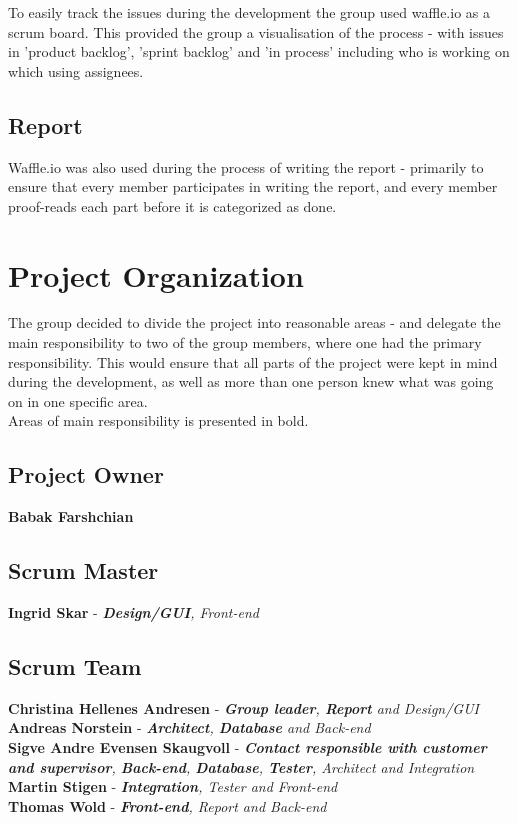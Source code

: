 \noindent To easily track the issues during the development the group used waffle.io as a scrum board. This provided the group a visualisation of the process - with issues in 'product backlog', 'sprint backlog' and 'in process' including who is working on which using assignees. 

\subsection{Report}
Waffle.io was also used during the process of writing the report - primarily to ensure that every member participates in writing the report, and every member proof-reads each part before it is categorized as done.  


\section{Project Organization}
The group decided to divide the project into reasonable areas - and delegate the main responsibility to two of the group members, where one had the primary responsibility. This would ensure that all parts of the project were kept in mind during the development, as well as more than one person knew what was going on in one specific area.\\
Areas of main responsibility is presented in bold.

\subsection{Project Owner}
\textbf{Babak Farshchian}
\subsection{Scrum Master}
\textbf{Ingrid Skar} - \emph{\textbf{Design/GUI}, Front-end}
\subsection{Scrum Team}
\textbf{Christina Hellenes Andresen} - \emph{\textbf{Group leader}, \textbf{Report} and Design/GUI}\\
\noindent \textbf{Andreas Norstein} - \emph{\textbf{Architect}, \textbf{Database} and Back-end}\\
\noindent \textbf{Sigve Andre Evensen Skaugvoll} - \emph{\textbf{Contact responsible with customer and supervisor}, \textbf{Back-end}, \textbf{Database}, \textbf{Tester}, Architect and Integration}\\
\noindent \textbf{Martin Stigen} - \emph{\textbf{Integration}, Tester and Front-end} \\
\noindent \textbf{Thomas Wold} - \emph{\textbf{Front-end}, Report and Back-end}\\ 

